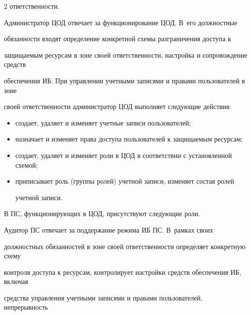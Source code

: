 \begin{multicols}{2}
ответственности. 


       


       Администратор ЦОД отвечает за функционирование ЦОД. В~его должностные 


обязанности входят определение конкретной схемы разграничения доступа к 


защищаемым ресурсам в зоне своей ответственности, настройка и сопровождение средств 


обеспечения ИБ. При управлении учетными записями и правами пользователей в зоне 


своей ответственности администратор ЦОД выполняет следующие действия: 


       \begin{itemize}


\item создает, удаляет и изменяет учетные записи пользователей;\\[-14pt] 


\item назначает и изменяет права доступа пользователей к защищаемым ресурсам;\\[-14pt] 


\item создает, удаляет и изменяет роли в ЦОД в соответствии с уста\-нов\-лен\-ной схемой;\\[-14pt]


\item приписывает роль (группы ролей) учетной записи, изменяет состав ролей 


учетной записи.


\end{itemize}





       В ПС, функционирующих в ЦОД, присутствуют следующие роли.


       \pagebreak


       


       Аудитор ПС отвечает за поддержание режима ИБ ПС. В~рамках своих 


должностных обязанностей в зоне своей ответственности определяет конкретную схему 


контроля доступа к ресурсам, контролирует настройки средств обеспечения ИБ, включая 


средства управления учетными записями и правами пользователей, непрерывность 



\end{multicols}
